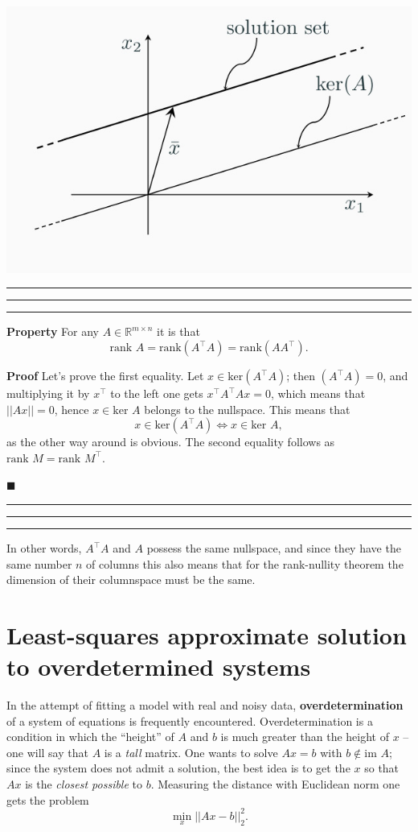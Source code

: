 \documentclass[10pt]{report}
\begin{document}
\begin{center}
\includegraphics[scale=0.3]{./pics/alg/lssolker.jpg}
\end{center}

\vspace*{0.6cm}\hrule
\hrule
\hrule
\vspace*{0.4cm}


\textbf{Property} For any \(A \in \mathbb{R}^{m \times n}\) it is that $$\mbox{rank }A = \mbox{rank}(A^\top A) = \mbox{rank}(AA^\top).$$

\textbf{Proof} Let's prove the first equality. Let \(x \in \mbox{ker}(A^\top A)\); then \((A^\top A)=0\), and multiplying it by \(x^\top\) to the left one gets \(x^\top A^\top A x = 0\), which means that \(||Ax|| = 0\), hence \(x \in \mbox{ker }A\) belongs to the nullspace. This means that $$x \in \mbox{ker}(A^\top A) \Leftrightarrow x \in \mbox{ker }A,$$ as the other way around is obvious. The second equality follows as \(\mbox{rank }M = \mbox{rank }M^\top\).

\begin{flushright}
$\blacksquare$
\end{flushright}

\vspace*{0.6cm}\hrule
\hrule
\hrule
\vspace*{0.4cm}


In other words, \(A^\top A\) and \(A\) possess the same nullspace, and since they have the same number \(n\) of columns this also means that for the rank\--nullity theorem the dimension of their columnspace must be the same.

\section{Least\--squares approximate solution to overdetermined systems}
\label{sec:orgf26a67a}
In the attempt of fitting a model with real and noisy data, \textbf{overdetermination} of a system of equations is frequently encountered. Overdetermination is a condition in which the ``height'' of \(A\) and \(b\) is much greater than the height of \(x\) -- one will say that \(A\) is a \emph{tall} matrix. One wants to solve \(Ax = b\) with \(b \notin \mbox{im }A\); since the system does not admit a solution, the best idea is to get the \(x\) so that \(Ax\) is the \emph{closest possible} to \(b\). Measuring the distance with Euclidean norm one gets the problem $$\min_{x} ||Ax - b||^2_2.$$
\end{document}
